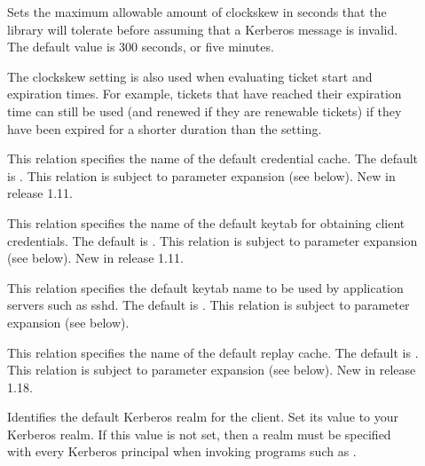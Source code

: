\documentclass[letterpaper,10pt,english]{sphinxmanual}
\begin{document}
\begin{description}
\item[{}] \leavevmode
Sets the maximum allowable amount of clockskew in seconds that the
library will tolerate before assuming that a Kerberos message is
invalid.  The default value is 300 seconds, or five minutes.

The clockskew setting is also used when evaluating ticket start
and expiration times.  For example, tickets that have reached
their expiration time can still be used (and renewed if they are
renewable tickets) if they have been expired for a shorter
duration than the  setting.

\item[{}] \leavevmode
This relation specifies the name of the default credential cache.
The default is {\hyperref[\detokenize{mitK5defaults:paths}]{}}.  This relation is subject to parameter
expansion (see below).  New in release 1.11.

\item[{}] \leavevmode
This relation specifies the name of the default keytab for
obtaining client credentials.  The default is {\hyperref[\detokenize{mitK5defaults:paths}]{}}.  This
relation is subject to parameter expansion (see below).
New in release 1.11.

\item[{}] \leavevmode
This relation specifies the default keytab name to be used by
application servers such as sshd.  The default is {\hyperref[\detokenize{mitK5defaults:paths}]{}}.  This
relation is subject to parameter expansion (see below).

\item[{}] \leavevmode
This relation specifies the name of the default replay cache.
The default is .  This relation is subject to parameter
expansion (see below).  New in release 1.18.

\item[{}] \leavevmode
Identifies the default Kerberos realm for the client.  Set its
value to your Kerberos realm.  If this value is not set, then a
realm must be specified with every Kerberos principal when
invoking programs such as .


\end{description}
\end{document}
